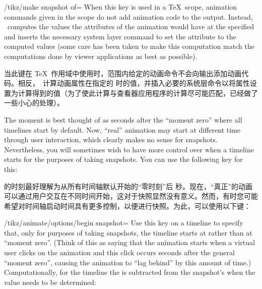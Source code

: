 \begin{key}{/tikz/make snapshot of=}
    When this key is used in a \TeX\ scope, animation commands given in the
    scope do not add animation code to the output. Instead, \tikzname\ computes
    the values the attributes of the animation would have at the specified
     and inserts the necessary system layer command to set the
    attribute to the computed values (some care has been taken to make this
    computation match the computations done by viewer applications as best as
    possible).
    
    当此键在 \TeX\ 作用域中使用时，范围内给定的动画命令不会向输出添加动画代码。相反，\tikzname\ 计算动画属性在指定的  时的值，并插入必要的系统层命令以将属性设置为计算得到的值（为了使此计算与查看器应用程序的计算尽可能匹配，已经做了一些小心的处理）。
\begin{codeexample}[preamble={\usetikzlibrary{animations}}]
\end{codeexample}

    The moment  is best thought of as  seconds after the
    ``moment zero'' where all timelines start by default. Now, ``real''
    animation may start at different time through user interaction, which
    clearly makes no sense for snapshots. Nevertheless, you will sometimes wish
    to have more control over when a timeline starts for the purposes of taking
    snapshots. You can use the following key for this:

     的时刻最好理解为从所有时间轴默认开始的“零时刻”后  秒。现在，“真正”的动画可以通过用户交互在不同时间开始，这对于快照显然没有意义。然而，有时您可能希望对时间轴启动时间具有更多控制，以便进行快照。为此，可以使用以下键：

    \begin{key}{/tikz/animate/options/begin snapshot=}
        Use this key on a timeline to specify that, only for purposes of taking
        snapshots, the timeline starts at  rather than at
        ``moment zero''. (Think of this as saying that the animation starts
        when a virtual user clicks on the animation and this click occurs
         seconds after the general ``moment zero'', causing
        the animation to ``lag behind'' by this amount of time.)
        Computationally, for the timeline the  is subtracted
        from the snapshot's  when the value needs to be determined:
        

\end{key}
\end{key}
